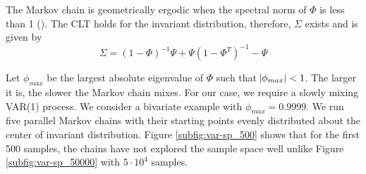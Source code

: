 \documentclass[11pt]{article}
\theoremstyle{remark}
\begin{document}
The Markov chain is geometrically ergodic when the spectral norm of $\Phi$ is less than 1 (\cite{10.2307/1427459}). The CLT holds for the invariant distribution, therefore, $\Sigma$ exists and is given by
%
\[
\Sigma = (1 - \Phi)^{-1}\Psi + \Psi(1 - \Phi^T)^{-1} - \Psi
\]

Let $\phi_{max}$ be the largest absolute eigenvalue of $\Phi$ such that $\abs{\phi_{max}} < 1$. The larger it is, the slower the Markov chain mixes. For our case, we require a slowly mixing VAR(1) process. We consider a bivariate example with $\phi_{max} = 0.9999$. We run five parallel Markov chains with their starting points evenly distributed about the center of invariant distribution. Figure \ref{subfig:var-sp_500} shows that for the first 500 samples, the chains have not explored the sample space well unlike Figure \ref{subfig:var-sp_50000} with $5\cdot 10^4$ samples.  
\end{document}
